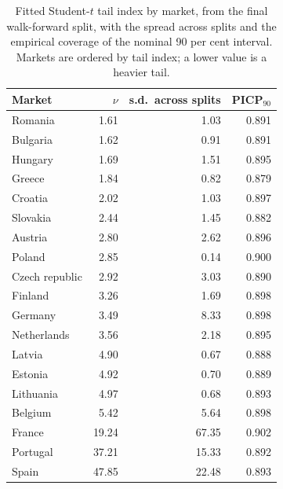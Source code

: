 \begin{table}[htbp]
\centering
\small
\caption{Fitted Student-$t$ tail index by market, from the final walk-forward split, with the spread across splits and the empirical coverage of the nominal 90 per cent interval. Markets are ordered by tail index; a lower value is a heavier tail.}
\label{tab:nu-by-channel}
\begin{tabular}{@{}lrrr@{}}
\toprule
Market & $\nu$ & s.d.\ across splits & PICP$_{90}$ \\
\midrule
Romania & 1.61 & 1.03 & 0.891 \\
Bulgaria & 1.62 & 0.91 & 0.891 \\
Hungary & 1.69 & 1.51 & 0.895 \\
Greece & 1.84 & 0.82 & 0.879 \\
Croatia & 2.02 & 1.03 & 0.897 \\
Slovakia & 2.44 & 1.45 & 0.882 \\
Austria & 2.80 & 2.62 & 0.896 \\
Poland & 2.85 & 0.14 & 0.900 \\
Czech republic & 2.92 & 3.03 & 0.890 \\
Finland & 3.26 & 1.69 & 0.898 \\
Germany & 3.49 & 8.33 & 0.898 \\
Netherlands & 3.56 & 2.18 & 0.895 \\
Latvia & 4.90 & 0.67 & 0.888 \\
Estonia & 4.92 & 0.70 & 0.889 \\
Lithuania & 4.97 & 0.68 & 0.893 \\
Belgium & 5.42 & 5.64 & 0.898 \\
France & 19.24 & 67.35 & 0.902 \\
Portugal & 37.21 & 15.33 & 0.892 \\
Spain & 47.85 & 22.48 & 0.893 \\
\bottomrule
\end{tabular}
\end{table}
